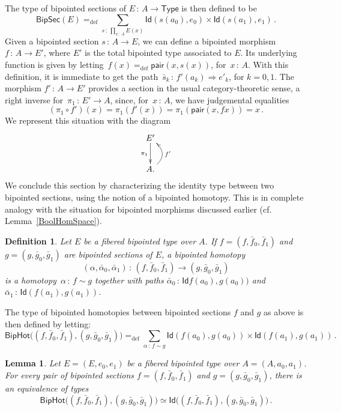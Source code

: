 \documentclass[10pt,a4paper,oneside,reqno]{amsart}
\theoremstyle{mythm}
\newtheorem{lemma}[theorem]{Lemma}
\theoremstyle{mydef}
\newtheorem{definition}[theorem]{Definition}
\theoremstyle{myrmk}
\newcommand{\ie}{\text{i.e.\ }}
\newcommand{\deq}{=}
\newcommand{\defeq}{=_{\mathrm{def}}}
\newcommand{\co}{\,{:}\,}
\newcommand{\Id}{\mathsf{Id}}
\newcommand{\pair}{\mathsf{pair}}
\newcommand{\U}{\mathsf{Type}}
\newcommand{\BipHot}{\mathsf{BipHot}}
\newcommand{\BipSec}{\mathsf{BipSec}}
\begin{document}
The type of bipointed sections of $E \co A \to \U$ is then defined to be
\[
\BipSec(E) \defeq \sum_{s \co \prod_{x \co A} E(x)} \Id(s(a_0),  e_0)  \times \Id( s(a_1), e_1)  \, .
\]
Given a bipointed section $s \co A \to E$, we can define a bipointed morphism~$f  \co A \to E'$, where $E'$ is the
total bipointed type associated to $E$. Its underlying function is given by 
letting~$f(x) \defeq \pair(x, s(x))$, for~$x \co A$. With this definition, it is 
immediate to get the path~$\bar{s}_k \co f'(a_k) \Rightarrow e'_k$, for $k = 0, 1$.
The morphism $f' \co A \to E'$ provides a section in the usual category-theoretic sense, \ie a right inverse for~$\pi_1 \co E' \to A$,
 since, for~$x \co A$, we have judgemental equalities
\[
 (\pi_1 \circ f')(x) \deq \pi_1 (f'(x)) \deq \pi_1 (\pair(x, f x)) \deq x \, .
\]
 We represent this situation with the diagram
\[
\xymatrix{
E' \ar[d]_{\pi_1} \\
A . \ar@/_1.2pc/[u]_{f'} }
\]
We conclude this section by characterizing the identity type between two bipointed sections, using
the notion of a bipointed homotopy. This is in complete analogy with the situation for bipointed
morphisms discussed earlier (cf.\,Lemma~\ref{BoolHomSpace}). 


\begin{definition} \label{def:2cellsection} Let $E$ be a fibered bipointed type over $A$. If $f = (f, \bar{f}_0,\bar{f}_1)$ and $g = (g, \bar{g}_0, \bar{g}_1)$ are bipointed sections of $E$, a \emph{bipointed homotopy} 
\[
(\alpha, \bar{\alpha}_0, \bar{\alpha}_1) \co (f, \bar{f}_0, \bar{f}_1)  \rightarrow (g, \bar{g}_0, \bar{g}_1)
\]
is a homotopy~$\alpha \co f \sim g$ together with paths $\bar{\alpha}_0 \co \Id  f(a_0) ,  g(a_0))$ and 
$\bar{\alpha}_1 \co \Id( f(a_1),  g(a_1))$. 
\end{definition} 

The type of bipointed homotopies between bipointed sections $f$ and $g$ as above is then defined by letting:
\[
\BipHot \big( (f, \bar{f}_0, \bar{f}_1), (g, \bar{g}_0, \bar{g}_1) \big) \defeq
\sum_{\alpha \co f \sim g} \Id ( f(a_0), g(a_0) ) \times \Id ( f(a_1) , g(a_1) ) \, .
\]


\begin{lemma} \label{thm:biphot}
Let $E = (E, e_0, e_1)$ be a fibered bipointed type over $A = (A, a_0, a_1)$. 
For every pair of bipointed sections $f = (f, \bar{f}_0, \bar{f}_1)$ and $g = (g, \bar{g}_0, \bar{g}_1)$, 
there is an equivalence of types
\[
\BipHot \big( (f, \bar{f}_0, \bar{f}_1), (g, \bar{g}_0, \bar{g}_1) \big)
\simeq 
\Id\big( (f, \bar{f}_0, \bar{f}_1), (g, \bar{g}_0, \bar{g}_1) \big) \, .
\]
\end{lemma}
\end{document}
